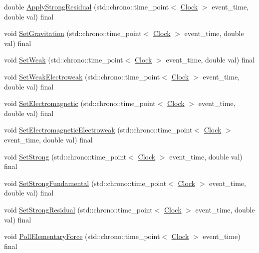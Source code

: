 \begin{DoxyCompactItemize}
\item 
double \hyperlink{class_dimension_a2ae0b6a8ee17f6e28b6d2d3209df4bf4}{Apply\+Strong\+Residual} (std\+::chrono\+::time\+\_\+point$<$ \hyperlink{universe_8h_a0ef8d951d1ca5ab3cfaf7ab4c7a6fd80}{Clock} $>$ event\+\_\+time, double val) final
\item 
void \hyperlink{class_dimension_aeec6887382d09e3d78382582ff4e7c33}{Set\+Gravitation} (std\+::chrono\+::time\+\_\+point$<$ \hyperlink{universe_8h_a0ef8d951d1ca5ab3cfaf7ab4c7a6fd80}{Clock} $>$ event\+\_\+time, double val) final
\item 
void \hyperlink{class_dimension_a157cfa28dd6bc5518d622d01445ca827}{Set\+Weak} (std\+::chrono\+::time\+\_\+point$<$ \hyperlink{universe_8h_a0ef8d951d1ca5ab3cfaf7ab4c7a6fd80}{Clock} $>$ event\+\_\+time, double val) final
\item 
void \hyperlink{class_dimension_a1d2accef9e6adf747f5cc143ae4527c9}{Set\+Weak\+Electroweak} (std\+::chrono\+::time\+\_\+point$<$ \hyperlink{universe_8h_a0ef8d951d1ca5ab3cfaf7ab4c7a6fd80}{Clock} $>$ event\+\_\+time, double val) final
\item 
void \hyperlink{class_dimension_ad8c18ce6358904e01594092dca9f1311}{Set\+Electromagnetic} (std\+::chrono\+::time\+\_\+point$<$ \hyperlink{universe_8h_a0ef8d951d1ca5ab3cfaf7ab4c7a6fd80}{Clock} $>$ event\+\_\+time, double val) final
\item 
void \hyperlink{class_dimension_aead73fc6a25388d14b514b2170735b1b}{Set\+Electromagnetic\+Electroweak} (std\+::chrono\+::time\+\_\+point$<$ \hyperlink{universe_8h_a0ef8d951d1ca5ab3cfaf7ab4c7a6fd80}{Clock} $>$ event\+\_\+time, double val) final
\item 
void \hyperlink{class_dimension_ab9021cb6727ed590026bf870c638576d}{Set\+Strong} (std\+::chrono\+::time\+\_\+point$<$ \hyperlink{universe_8h_a0ef8d951d1ca5ab3cfaf7ab4c7a6fd80}{Clock} $>$ event\+\_\+time, double val) final
\item 
void \hyperlink{class_dimension_a2de864aaa4b1074684395dbe928468c1}{Set\+Strong\+Fundamental} (std\+::chrono\+::time\+\_\+point$<$ \hyperlink{universe_8h_a0ef8d951d1ca5ab3cfaf7ab4c7a6fd80}{Clock} $>$ event\+\_\+time, double val) final
\item 
void \hyperlink{class_dimension_a9bd5480b1da689cd58bf61dac7169080}{Set\+Strong\+Residual} (std\+::chrono\+::time\+\_\+point$<$ \hyperlink{universe_8h_a0ef8d951d1ca5ab3cfaf7ab4c7a6fd80}{Clock} $>$ event\+\_\+time, double val) final
\item 
void \hyperlink{class_dimension_a5b07f5c8558233c8f3488baf1fe3459a}{Poll\+Elementary\+Force} (std\+::chrono\+::time\+\_\+point$<$ \hyperlink{universe_8h_a0ef8d951d1ca5ab3cfaf7ab4c7a6fd80}{Clock} $>$ event\+\_\+time) final
\end{DoxyCompactItemize}
